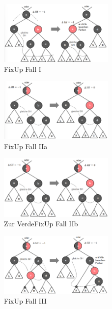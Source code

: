 \documentclass{article}
\begin{document}
            \newpage
            \begin{figure}[ht]
                \centering
                \includegraphics[width=0.5\textwidth]{Bilder/RSFixupI.png}
                \caption{FixUp Fall I}
                \label{fig:RSFixupI}
            \end{figure}
            \begin{figure}[ht]
                \centering
                \includegraphics[width=0.5\textwidth]{Bilder/RSFixupIIa.png}
                \caption{FixUp Fall IIa}
                \label{fig:RSFixupIIa}
            \end{figure}
            \begin{figure}[ht]
                \centering
                \includegraphics[width=0.5\textwidth]{Bilder/RSFixupIIb.png}
                \caption{Zur VerdeFixUp Fall IIb}
                \label{fig:RSFixupIIb}
            \end{figure}
            \begin{figure}[ht]
                \centering
                \includegraphics[width=0.5\textwidth]{Bilder/RSFixupIII.png}
                \caption{FixUp Fall III}
                \label{fig:RSFixupIII}
            \end{figure}
\end{document}
